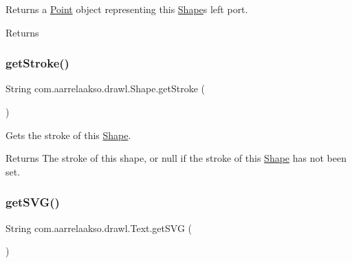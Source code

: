 Returns a \hyperlink{classcom_1_1aarrelaakso_1_1drawl_1_1_point}{Point} object representing this \hyperlink{classcom_1_1aarrelaakso_1_1drawl_1_1_shape}{Shape}\textquotesingle{}s left port. 

\begin{DoxyReturn}{Returns}

\end{DoxyReturn}
\mbox{\label{classcom_1_1aarrelaakso_1_1drawl_1_1_shape_a4e1d54c7e161e3af5053939ddefdf9e6}} 
\subsubsection{\texorpdfstring{get\+Stroke()}{getStroke()}}
{\footnotesize\ttfamily String com.\+aarrelaakso.\+drawl.\+Shape.\+get\+Stroke (\begin{DoxyParamCaption}{ }\end{DoxyParamCaption})\hspace{0.3cm}{\ttfamily [inherited]}}



Gets the stroke of this \hyperlink{classcom_1_1aarrelaakso_1_1drawl_1_1_shape}{Shape}. 

\begin{DoxyReturn}{Returns}
The stroke of this shape, or null if the stroke of this \hyperlink{classcom_1_1aarrelaakso_1_1drawl_1_1_shape}{Shape} has not been set. 
\end{DoxyReturn}
\mbox{\label{classcom_1_1aarrelaakso_1_1drawl_1_1_text_ab1a6091b007ea4da41de26bc8c6ea021}} 
\subsubsection{\texorpdfstring{get\+S\+V\+G()}{getSVG()}}
{\footnotesize\ttfamily String com.\+aarrelaakso.\+drawl.\+Text.\+get\+S\+VG (\begin{DoxyParamCaption}{ }\end{DoxyParamCaption})}



